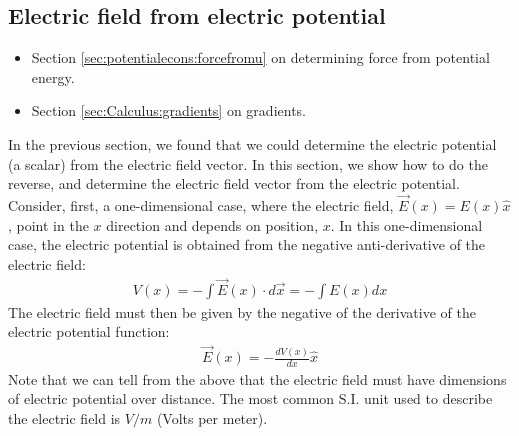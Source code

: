 \subsection{Electric field from electric potential}


\begin{review}
	\begin{itemize}
		\item Section \ref{sec:potentialecons:forcefromu} on determining force from potential energy.
		\item Section \ref{sec:Calculus:gradients} on gradients.
	\end{itemize}
\end{review}

In the previous section, we found that we could determine the electric potential (a scalar) from the electric field vector. In this section, we show how to do the reverse, and determine the electric field vector from the electric potential. Consider, first, a one-dimensional case, where the electric field, $\vec E(x)= E(x) \hat x$, point in the $x$ direction and depends on position, $x$. In this one-dimensional case, the electric potential is obtained from the negative anti-derivative of the electric field:
\begin{align*}
V(x)=-\int \vec E(x)\cdot d\vec x=-\int E(x) dx
\end{align*}
The electric field must then be given by the negative of the derivative of the electric potential function:
\begin{align*}
\vec E(x) = -\frac{dV(x)}{dx}\hat x
\end{align*}
Note that we can tell from the above that the electric field must have dimensions of electric potential over distance. The most common S.I. unit used to describe the electric field is $\si{V/m}$ (Volts per meter). 

